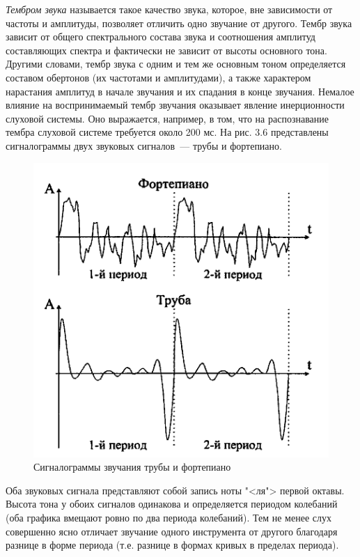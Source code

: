 \documentclass[oneside, final, 14pt]{extreport}
\begin{document}
{\itshape Тембром звука} называется такое качество звука, которое, вне зависимости от частоты и амплитуды, позволяет отличить одно звучание от другого. Тембр звука зависит от общего спектрального состава звука и соотношения амплитуд составляющих спектра и фактически не зависит от высоты основного тона. Другими словами, тембр звука с одним и тем же основным тоном определяется составом обертонов (их частотами и амплитудами), а также характером нарастания амплитуд в начале звучания и их спадания в конце звучания. Немалое влияние на воспринимаемый тембр звучания оказывает явление инерционности слуховой системы. Оно выражается, например, в том, что на распознавание тембра слуховой системе требуется около 200 мс. На рис. 3.6 представлены сигналограммы двух звуковых сигналов~--- трубы и фортепиано.

\begin{figure}[h]
\centering
\includegraphics[scale=0.8]{pic-ear-06}
\caption{ Сигналограммы звучания трубы и фортепиано}
\label{pic-ear-06}
\end{figure}

Оба звуковых сигнала представляют собой запись ноты "<ля"> первой октавы. Высота тона у обоих сигналов одинакова и определяется периодом колебаний (оба графика вмещают ровно по два периода колебаний). Тем не менее слух совершенно ясно отличает звучание одного инструмента от другого благодаря разнице в форме периода (т.е. разнице в формах кривых в пределах периода).
\end{document}
